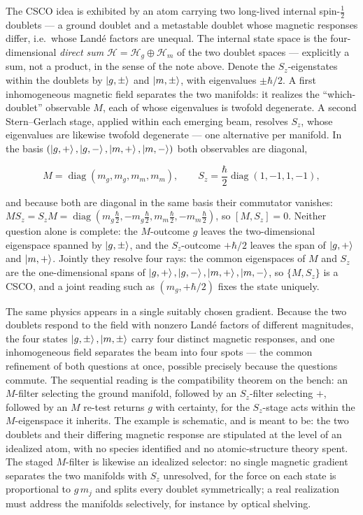 The CSCO idea is exhibited by an atom carrying two long-lived internal spin-$\tfrac12$ doublets --- a ground doublet and a metastable doublet whose magnetic responses differ, i.e.\ whose Land\'e factors are unequal. The internal state space is the four-dimensional \emph{direct sum} $\mathcal H=\mathcal H_g\oplus\mathcal H_m$ of the two doublet spaces --- explicitly a sum, not a product, in the sense of the note above. Denote the $S_z$-eigenstates within the doublets by $\ket{g,\pm}$ and $\ket{m,\pm}$, with eigenvalues $\pm\hbar/2$. A first inhomogeneous magnetic field separates the two manifolds: it realizes the ``which-doublet'' observable $M$, each of whose eigenvalues is twofold degenerate. A second Stern--Gerlach stage, applied within each emerging beam, resolves $S_z$, whose eigenvalues are likewise twofold degenerate --- one alternative per manifold. In the basis $(\ket{g,+},\ket{g,-},\ket{m,+},\ket{m,-})$ both observables are diagonal,
\begin{linenomath}
\begin{equation}
    M=\operatorname{diag}(m_g,m_g,m_m,m_m),
    \qquad
    S_z=\frac{\hbar}{2}\operatorname{diag}(1,-1,1,-1),
\end{equation}
\end{linenomath}
and because both are diagonal in the same basis their commutator vanishes: $M S_z=S_z M=\operatorname{diag}(m_g\frac{\hbar}{2}, -m_g\frac{\hbar}{2}, m_m\frac{\hbar}{2}, -m_m\frac{\hbar}{2})$, so $[M,S_z]=0$. Neither question alone is complete: the $M$-outcome $g$ leaves the two-dimensional eigenspace spanned by $\ket{g,\pm}$, and the $S_z$-outcome $+\hbar/2$ leaves the span of $\ket{g,+}$ and $\ket{m,+}$. Jointly they resolve four rays: the common eigenspaces of $M$ and $S_z$ are the one-dimensional spans of $\ket{g,+},\ket{g,-},\ket{m,+},\ket{m,-}$, so $\{M,S_z\}$ is a CSCO, and a joint reading such as $(m_g,+\hbar/2)$ fixes the state uniquely.

The same physics appears in a single suitably chosen gradient. Because the two doublets respond to the field with nonzero Land\'e factors of different magnitudes, the four states $\ket{g,\pm},\ket{m,\pm}$ carry four distinct magnetic responses, and one inhomogeneous field separates the beam into four spots --- the common refinement of both questions at once, possible precisely because the questions commute. The sequential reading is the compatibility theorem on the bench: an $M$-filter selecting the ground manifold, followed by an $S_z$-filter selecting $+$, followed by an $M$ re-test returns $g$ with certainty, for the $S_z$-stage acts within the $M$-eigenspace it inherits. The example is schematic, and is meant to be: the two doublets and their differing magnetic response are stipulated at the level of an idealized atom, with no species identified and no atomic-structure theory spent. The staged $M$-filter is likewise an idealized selector: no single magnetic gradient separates the two manifolds with $S_z$ unresolved, for the force on each state is proportional to $g\,m_j$ and splits every doublet symmetrically; a real realization must address the manifolds selectively, for instance by optical shelving.

